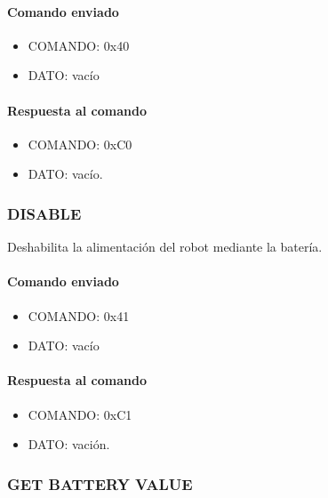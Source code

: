 \paragraph*{Comando enviado}

\begin{itemize}
	\item{COMANDO:} 0x40
	\item{DATO:} vac\'io
\end{itemize}

\paragraph*{Respuesta al comando}

\begin{itemize}
	\item{COMANDO:} 0xC0
	\item{DATO:} vac\'io.

\end{itemize}

\subsubsection{DISABLE}
\label{hA_protocolo_get_battery_value}

Deshabilita la alimentaci\'on del robot mediante la bater\'ia.

\paragraph*{Comando enviado}

\begin{itemize}
	\item{COMANDO:} 0x41
	\item{DATO:} vac\'io
\end{itemize}

\paragraph*{Respuesta al comando}

\begin{itemize}
	\item{COMANDO:} 0xC1
	\item{DATO:} vaci\'on.

\end{itemize}

\subsubsection{GET BATTERY VALUE}
\label{hA_protocolo_get_battery_value}

